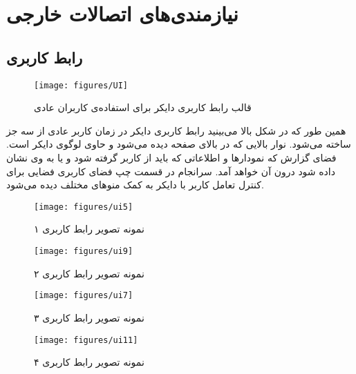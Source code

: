 \chapter{نیازمندی‌های اتصالات خارجی}
\clearpage
{}

\section {رابط کاربری}

\begin{figure}[!ht]
  \centering 
  \texttt{[image: figures/UI]}
  \caption[رابط کاربری دایکر]
  {قالب رابط کاربری دایکر برای استفاده‌ی کاربران عادی}
\end{figure}

همین طور که در شکل بالا می‌بینید رابط کاربری دایکر در زمان کاربر عادی از سه جز ساخته می‌شود.
نوار بالایی که در بالا‌ی صفحه دیده‌ می‌شود و حاوی لوگوی دایکر است. فضای گزارش که نمودار‌ها و اطلاعاتی که باید
از کاربر گرفته شود و یا به وی نشان داده شود درون آن خواهد آمد.
سرانجام در قسمت چپ فضای کاربری فضایی برای کنترل تعامل کاربر با دایکر به کمک منو‌های مختلف
دیده می‌شود.

\begin{figure}[!ht]
  \centering 
  \texttt{[image: figures/ui5]}
  \caption[تصویر واسط کاربری ۱]
  {نمونه تصویر رابط کاربری ۱}
\end{figure}

\begin{figure}[!ht]
  \centering 
  \texttt{[image: figures/ui9]}
  \caption[تصویر واسط کاربری ۲]
  {نمونه تصویر رابط کاربری ۲}
\end{figure}

\begin{figure}[!ht]
  \centering 
  \texttt{[image: figures/ui7]}
  \caption[تصویر واسط کاربری ۳]
  {نمونه تصویر رابط کاربری ۳}
\end{figure}

\begin{figure}[!ht]
  \centering 
  \texttt{[image: figures/ui11]}
  \caption[تصویر واسط کاربری ۴]
  {نمونه تصویر رابط کاربری ۴}
\end{figure}

